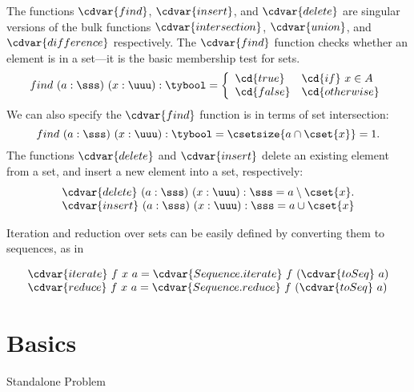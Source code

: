 \begin{gram}
The functions $\cdvar{find}$, $\cdvar{insert}$, and $\cdvar{delete}$ are singular
versions of the bulk functions $\cdvar{intersection}$, $\cdvar{union}$, and
$\cdvar{difference}$ respectively.
%
The $\cdvar{find}$ function checks whether an element is in a set---it is
the basic membership test for sets.
%
\[
find~(a  : \sss)~(x : \uuu) : \tybool = \left\{
                \begin{array}{ll}
                \cd{true} & \cd{if}~x \in A \\
                \cd{false} & \cd{otherwise}
                \end{array} \right.
\]
%
We can also specify the $\cdvar{find}$ function is in terms of set
intersection:
\[
find~(a : \sss)~(x : \uuu) : \tybool = \csetsize{a \cap \cset{x}} = 1.
\]
%
The functions $\cdvar{delete}$ and $\cdvar{insert}$ 
%
delete an existing element from a set, and
%
insert a new element into a set,
%
respectively:
%
\[
\begin{array}{l}
\cdvar{delete}~(a  : \sss)~(x  : \uuu) : \sss = a \setminus \cset{x}.\\
\cdvar{insert}~(a : \sss)~(x : \uuu) : \sss = a \cup \cset{x}
\end{array}
\]
%
\end{gram}

\begin{gram}
Iteration and reduction over sets can be easily defined by converting
them to sequences, as in

\[
\begin{array}{l}
\cdvar{iterate}~f~x~a = \cdvar{Sequence.iterate}~f~(\cdvar{toSeq}~a)\\
\cdvar{reduce}~f~x~a = \cdvar{Sequence.reduce}~f~(\cdvar{toSeq}~a)
\end{array}
\]
\end{gram}


\section[50]{Basics}

\begin{problem}
Standalone Problem
\end{problem}

